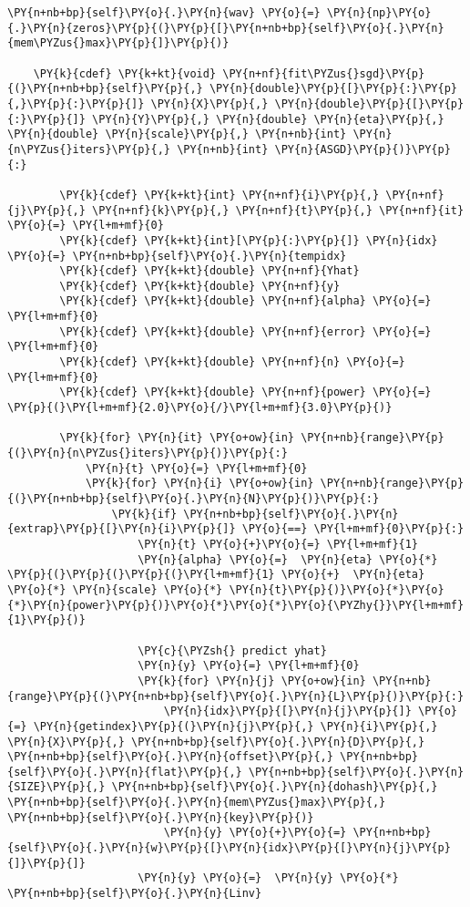 \begin{Verbatim}[commandchars=\\\{\}]
            \PY{n+nb+bp}{self}\PY{o}{.}\PY{n}{wav} \PY{o}{=} \PY{n}{np}\PY{o}{.}\PY{n}{zeros}\PY{p}{(}\PY{p}{[}\PY{n+nb+bp}{self}\PY{o}{.}\PY{n}{mem\PYZus{}max}\PY{p}{]}\PY{p}{)}

    \PY{k}{cdef} \PY{k+kt}{void} \PY{n+nf}{fit\PYZus{}sgd}\PY{p}{(}\PY{n+nb+bp}{self}\PY{p}{,} \PY{n}{double}\PY{p}{[}\PY{p}{:}\PY{p}{,}\PY{p}{:}\PY{p}{]} \PY{n}{X}\PY{p}{,} \PY{n}{double}\PY{p}{[}\PY{p}{:}\PY{p}{]} \PY{n}{Y}\PY{p}{,} \PY{n}{double} \PY{n}{eta}\PY{p}{,} \PY{n}{double} \PY{n}{scale}\PY{p}{,} \PY{n+nb}{int} \PY{n}{n\PYZus{}iters}\PY{p}{,} \PY{n+nb}{int} \PY{n}{ASGD}\PY{p}{)}\PY{p}{:}

        \PY{k}{cdef} \PY{k+kt}{int} \PY{n+nf}{i}\PY{p}{,} \PY{n+nf}{j}\PY{p}{,} \PY{n+nf}{k}\PY{p}{,} \PY{n+nf}{t}\PY{p}{,} \PY{n+nf}{it} \PY{o}{=} \PY{l+m+mf}{0}
        \PY{k}{cdef} \PY{k+kt}{int}[\PY{p}{:}\PY{p}{]} \PY{n}{idx} \PY{o}{=} \PY{n+nb+bp}{self}\PY{o}{.}\PY{n}{tempidx}
        \PY{k}{cdef} \PY{k+kt}{double} \PY{n+nf}{Yhat}
        \PY{k}{cdef} \PY{k+kt}{double} \PY{n+nf}{y}
        \PY{k}{cdef} \PY{k+kt}{double} \PY{n+nf}{alpha} \PY{o}{=} \PY{l+m+mf}{0}
        \PY{k}{cdef} \PY{k+kt}{double} \PY{n+nf}{error} \PY{o}{=} \PY{l+m+mf}{0}
        \PY{k}{cdef} \PY{k+kt}{double} \PY{n+nf}{n} \PY{o}{=} \PY{l+m+mf}{0}
        \PY{k}{cdef} \PY{k+kt}{double} \PY{n+nf}{power} \PY{o}{=} \PY{p}{(}\PY{l+m+mf}{2.0}\PY{o}{/}\PY{l+m+mf}{3.0}\PY{p}{)}
        
        \PY{k}{for} \PY{n}{it} \PY{o+ow}{in} \PY{n+nb}{range}\PY{p}{(}\PY{n}{n\PYZus{}iters}\PY{p}{)}\PY{p}{:}
            \PY{n}{t} \PY{o}{=} \PY{l+m+mf}{0}
            \PY{k}{for} \PY{n}{i} \PY{o+ow}{in} \PY{n+nb}{range}\PY{p}{(}\PY{n+nb+bp}{self}\PY{o}{.}\PY{n}{N}\PY{p}{)}\PY{p}{:}
                \PY{k}{if} \PY{n+nb+bp}{self}\PY{o}{.}\PY{n}{extrap}\PY{p}{[}\PY{n}{i}\PY{p}{]} \PY{o}{==} \PY{l+m+mf}{0}\PY{p}{:}
                    \PY{n}{t} \PY{o}{+}\PY{o}{=} \PY{l+m+mf}{1}
                    \PY{n}{alpha} \PY{o}{=}  \PY{n}{eta} \PY{o}{*} \PY{p}{(}\PY{p}{(}\PY{p}{(}\PY{l+m+mf}{1} \PY{o}{+}  \PY{n}{eta} \PY{o}{*} \PY{n}{scale} \PY{o}{*} \PY{n}{t}\PY{p}{)}\PY{o}{*}\PY{o}{*}\PY{n}{power}\PY{p}{)}\PY{o}{*}\PY{o}{*}\PY{o}{\PYZhy{}}\PY{l+m+mf}{1}\PY{p}{)}

                    \PY{c}{\PYZsh{} predict yhat}
                    \PY{n}{y} \PY{o}{=} \PY{l+m+mf}{0}
                    \PY{k}{for} \PY{n}{j} \PY{o+ow}{in} \PY{n+nb}{range}\PY{p}{(}\PY{n+nb+bp}{self}\PY{o}{.}\PY{n}{L}\PY{p}{)}\PY{p}{:} 
                        \PY{n}{idx}\PY{p}{[}\PY{n}{j}\PY{p}{]} \PY{o}{=} \PY{n}{getindex}\PY{p}{(}\PY{n}{j}\PY{p}{,} \PY{n}{i}\PY{p}{,} \PY{n}{X}\PY{p}{,} \PY{n+nb+bp}{self}\PY{o}{.}\PY{n}{D}\PY{p}{,} \PY{n+nb+bp}{self}\PY{o}{.}\PY{n}{offset}\PY{p}{,} \PY{n+nb+bp}{self}\PY{o}{.}\PY{n}{flat}\PY{p}{,} \PY{n+nb+bp}{self}\PY{o}{.}\PY{n}{SIZE}\PY{p}{,} \PY{n+nb+bp}{self}\PY{o}{.}\PY{n}{dohash}\PY{p}{,} \PY{n+nb+bp}{self}\PY{o}{.}\PY{n}{mem\PYZus{}max}\PY{p}{,} \PY{n+nb+bp}{self}\PY{o}{.}\PY{n}{key}\PY{p}{)}
                        \PY{n}{y} \PY{o}{+}\PY{o}{=} \PY{n+nb+bp}{self}\PY{o}{.}\PY{n}{w}\PY{p}{[}\PY{n}{idx}\PY{p}{[}\PY{n}{j}\PY{p}{]}\PY{p}{]}
                    \PY{n}{y} \PY{o}{=}  \PY{n}{y} \PY{o}{*} \PY{n+nb+bp}{self}\PY{o}{.}\PY{n}{Linv}


\end{Verbatim}
